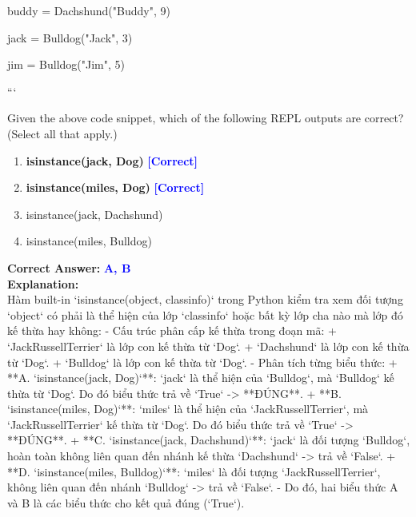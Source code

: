\documentclass[11pt,a4paper]{article}
\begin{document}
\begin{minipage}{\textwidth}
{\newline
buddy = Dachshund("Buddy", 9)\newline

\newline
jack = Bulldog("Jack", 3)\newline

\newline
jim = Bulldog("Jim", 5)\newline

\newline
```\newline

\newline
\newline

\newline
Given the above code snippet, which of the following REPL outputs are correct? (Select all that apply.)}

\begin{enumerate}[label=\Alph*.]
    \item \textbf{isinstance(jack, Dog)} \hfill \textcolor{blue}{\textbf{[Correct]}}
    \item \textbf{isinstance(miles, Dog)} \hfill \textcolor{blue}{\textbf{[Correct]}}
    \item isinstance(jack, Dachshund)
    \item isinstance(miles, Bulldog)
\end{enumerate}

\noindent \textbf{Correct Answer:} \textcolor{blue}{\textbf{A, B}} \\[4pt]
\noindent \textbf{Explanation:}\\
Hàm built-in `isinstance(object, classinfo)` trong Python kiểm tra xem đối tượng `object` có phải là thể hiện của lớp `classinfo` hoặc bất kỳ lớp cha nào mà lớp đó kế thừa hay không:\newline
- Cấu trúc phân cấp kế thừa trong đoạn mã:\newline
  + `JackRussellTerrier` là lớp con kế thừa từ `Dog`.\newline
  + `Dachshund` là lớp con kế thừa từ `Dog`.\newline
  + `Bulldog` là lớp con kế thừa từ `Dog`.\newline
- Phân tích từng biểu thức:\newline
  + **A. `isinstance(jack, Dog)`**: `jack` là thể hiện của `Bulldog`, mà `Bulldog` kế thừa từ `Dog`. Do đó biểu thức trả về `True` -> **ĐÚNG**.\newline
  + **B. `isinstance(miles, Dog)`**: `miles` là thể hiện của `JackRussellTerrier`, mà `JackRussellTerrier` kế thừa từ `Dog`. Do đó biểu thức trả về `True` -> **ĐÚNG**.\newline
  + **C. `isinstance(jack, Dachshund)`**: `jack` là đối tượng `Bulldog`, hoàn toàn không liên quan đến nhánh kế thừa `Dachshund` -> trả về `False`.\newline
  + **D. `isinstance(miles, Bulldog)`**: `miles` là đối tượng `JackRussellTerrier`, không liên quan đến nhánh `Bulldog` -> trả về `False`.\newline
- Do đó, hai biểu thức A và B là các biểu thức cho kết quả đúng (`True`).
\end{minipage}
\end{document}
